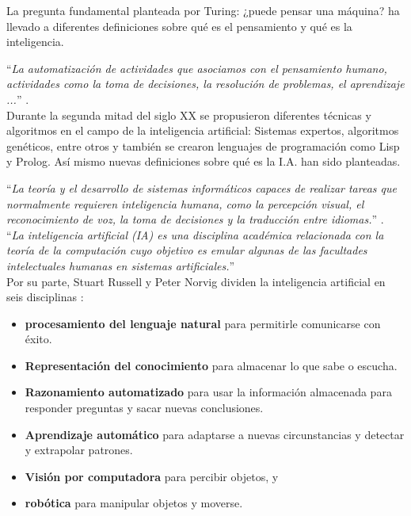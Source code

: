         La pregunta fundamental planteada por Turing: ¿puede pensar una máquina? ha llevado a diferentes definiciones sobre qué es el pensamiento y qué es la inteligencia.
        
        ``\textit{La automatización de actividades que asociamos con el pensamiento humano, actividades como la toma de decisiones, la resolución de problemas, el aprendizaje ...}'' \cite{Bellman1978}. \\
        
        Durante la segunda mitad del siglo XX se propusieron diferentes técnicas y algoritmos en el campo de la inteligencia artificial: Sistemas expertos, algoritmos genéticos, entre otros y también se crearon lenguajes de programación como Lisp y Prolog. Así mismo nuevas definiciones sobre qué es la I.A. han sido planteadas.
        
        ``\textit{La teoría y el desarrollo de sistemas informáticos capaces de realizar tareas que normalmente requieren inteligencia humana, como la percepción visual, el reconocimiento de voz, la toma de decisiones y la traducción entre idiomas.}'' \cite{OxfordDicAI}. \\
        
        ``\textit{La inteligencia artificial (IA) es una disciplina académica relacionada con la teoría de la computación cuyo objetivo es emular algunas de las facultades intelectuales humanas en sistemas artificiales.}'' \cite[Pag. 12]{benitez2014AI} \\
        
        Por su parte, Stuart Russell y Peter Norvig dividen la inteligencia artificial en seis disciplinas \cite{Russell2009}: 
        
        \begin{itemize}
            \item \textbf{procesamiento del lenguaje natural} para permitirle comunicarse con éxito.
            \item \textbf{Representación del conocimiento} para almacenar lo que sabe o escucha.
            \item \textbf{Razonamiento automatizado} para usar la información almacenada para responder preguntas y sacar nuevas conclusiones.
            \item \textbf{Aprendizaje automático} para adaptarse a nuevas circunstancias y detectar y extrapolar patrones.
            \item \textbf{Visión por computadora} para percibir objetos, y
            \item \textbf{robótica} para manipular objetos y moverse.
        \end{itemize}
  
